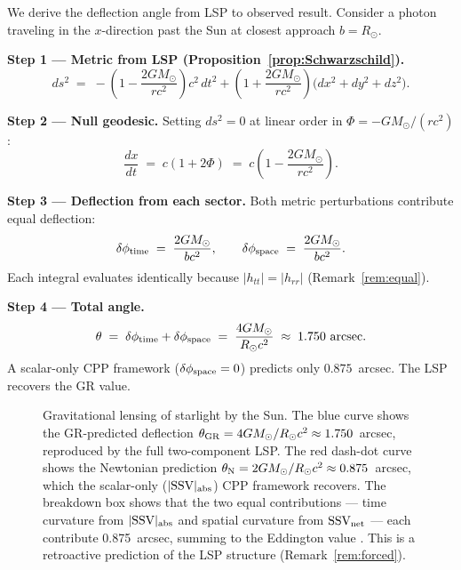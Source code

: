 \documentclass[12pt]{article}
\newcommand{\SSV}{\text{SSV}}
\begin{document}
We derive the deflection angle from LSP to observed result.
Consider a photon traveling in the $x$-direction past the Sun at
closest approach $b = R_\odot$.

\textbf{Step 1 --- Metric from LSP (Proposition~\ref{prop:Schwarzschild}).}
\begin{equation}
  ds^2 \;=\; -\!\left(1-\frac{2GM_\odot}{rc^2}\right)c^2\,dt^2
  + \left(1+\frac{2GM_\odot}{rc^2}\right)
  \bigl(dx^2+dy^2+dz^2\bigr).
  \label{eq:line_element}
\end{equation}

\textbf{Step 2 --- Null geodesic.}
Setting $ds^2 = 0$ at linear order in $\Phi = -GM_\odot/(rc^2)$:
\begin{equation}
  \frac{dx}{dt} \;=\; c\!\left(1 + 2\Phi\right)
  \;=\; c\!\left(1 - \frac{2GM_\odot}{rc^2}\right).
  \label{eq:speed}
\end{equation}

\textbf{Step 3 --- Deflection from each sector.}
Both metric perturbations contribute equal deflection:
\begin{equation}
  \delta\phi_{\rm time} \;=\; \frac{2GM_\odot}{bc^2},
  \qquad
  \delta\phi_{\rm space} \;=\; \frac{2GM_\odot}{bc^2}.
  \label{eq:deflection_components}
\end{equation}
Each integral evaluates identically because $|h_{tt}| = |h_{rr}|$
(Remark~\ref{rem:equal}).

\textbf{Step 4 --- Total angle.}
\begin{equation}
  \theta \;=\; \delta\phi_{\rm time} + \delta\phi_{\rm space}
  \;=\; \frac{4GM_\odot}{R_\odot c^2}
  \;\approx\; 1.750\ \text{arcsec}.
  \label{eq:lensing_result}
\end{equation}
A scalar-only CPP framework ($\delta\phi_{\rm space} = 0$) predicts
only $0.875$~arcsec.  The LSP recovers the GR value.

\begin{figure}[H]
  \centering
  
  \caption{Gravitational lensing of starlight by the Sun.
  The blue curve shows the GR-predicted deflection
  $\theta_{\rm GR} = 4GM_\odot/R_\odot c^2 \approx 1.750$~arcsec,
  reproduced by the full two-component LSP.
  The red dash-dot curve shows the Newtonian prediction
  $\theta_{\rm N} = 2GM_\odot/R_\odot c^2 \approx 0.875$~arcsec,
  which the scalar-only ($|\SSV|_{\rm abs}$) CPP framework recovers.
  The breakdown box shows that the two equal contributions ---
  time curvature from $|\SSV|_{\rm abs}$ and spatial curvature
  from $\mathbf{\SSV}_{\rm net}$ --- each contribute 0.875~arcsec,
  summing to the Eddington value \citep{eddington1920}.
  This is a retroactive prediction of the LSP structure
  (Remark~\ref{rem:forced}).}
  \label{fig:lensing}
\end{figure}
\end{document}
